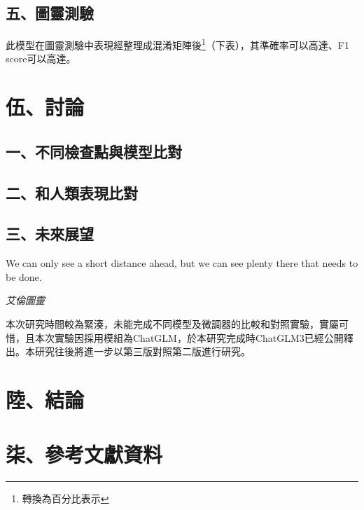 \documentclass[8pt,a4paper,新細明體,UTF8,natbib]{article}
\begin{document}
\begin{CJK*}{UTF8}{bsmi}
	\subsection{五、圖靈測驗}
	此模型在圖靈測驗中表現經整理成混淆矩陣後\footnote{轉換為百分比表示}（下表），其準確率可以高達、F1 score可以高達。

	\section{伍、討論}

	\subsection{一、不同檢查點與模型比對}
	\subsection{二、和人類表現比對}
	\subsection{三、未來展望}
	\epigraph{	We can only see a short distance ahead, but we can see plenty there that needs to be done.}{\textit{艾倫圖靈}}
	本次研究時間較為緊湊，未能完成不同模型及微調器的比較和對照實驗，實屬可惜，且本次實驗因採用模組為ChatGLM，於本研究完成時ChatGLM3已經公開釋出。本研究往後將進一步以第三版對照第二版進行研究。

	\section{陸、結論}

	\section{柒、參考文獻資料}
	
	\renewcommand{\refname}{}
	
\end{CJK*}
\end{document}
